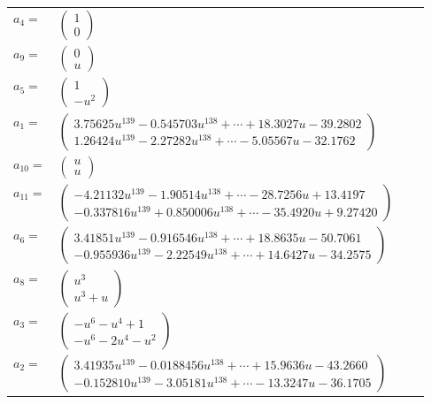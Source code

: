 \documentclass[1p]{elsarticle_modified}
\theoremstyle{definition}
\begin{document}
\begin{tabular}{m{7pt} m{180pt} m{7pt} m{180pt} }
\flushright $a_{4}=$&$\begin{pmatrix}1\\0\end{pmatrix}$ \\
\flushright $a_{9}=$&$\begin{pmatrix}0\\u\end{pmatrix}$ \\
\flushright $a_{5}=$&$\begin{pmatrix}1\\- u^2\end{pmatrix}$ \\
\flushright $a_{1}=$&$\begin{pmatrix}3.75625 u^{139}-0.545703 u^{138}+\cdots+18.3027 u-39.2802\\1.26424 u^{139}-2.27282 u^{138}+\cdots-5.05567 u-32.1762\end{pmatrix}$ \\
\flushright $a_{10}=$&$\begin{pmatrix}u\\u\end{pmatrix}$ \\
\flushright $a_{11}=$&$\begin{pmatrix}-4.21132 u^{139}-1.90514 u^{138}+\cdots-28.7256 u+13.4197\\-0.337816 u^{139}+0.850006 u^{138}+\cdots-35.4920 u+9.27420\end{pmatrix}$ \\
\flushright $a_{6}=$&$\begin{pmatrix}3.41851 u^{139}-0.916546 u^{138}+\cdots+18.8635 u-50.7061\\-0.955936 u^{139}-2.22549 u^{138}+\cdots+14.6427 u-34.2575\end{pmatrix}$ \\
\flushright $a_{8}=$&$\begin{pmatrix}u^3\\u^3+u\end{pmatrix}$ \\
\flushright $a_{3}=$&$\begin{pmatrix}- u^6- u^4+1\\- u^6-2 u^4- u^2\end{pmatrix}$ \\
\flushright $a_{2}=$&$\begin{pmatrix}3.41935 u^{139}-0.0188456 u^{138}+\cdots+15.9636 u-43.2660\\-0.152810 u^{139}-3.05181 u^{138}+\cdots-13.3247 u-36.1705\end{pmatrix}$ \\

\end{tabular}
\end{document}
